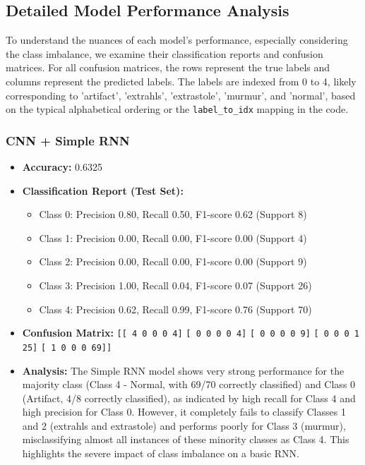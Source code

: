\documentclass[a4paper]{article}
\begin{document}
\begin{multicols}{2}
\subsection{Detailed Model Performance Analysis}
To understand the nuances of each model's performance, especially considering the class imbalance, we examine their classification reports and confusion matrices. For all confusion matrices, the rows represent the true labels and columns represent the predicted labels. The labels are indexed from 0 to 4, likely corresponding to 'artifact', 'extrahls', 'extrastole', 'murmur', and 'normal', based on the typical alphabetical ordering or the \texttt{label\_to\_idx} mapping in the code.

\subsubsection{CNN + Simple RNN}
\begin{itemize}
    \item \textbf{Accuracy:} 0.6325 
    \item \textbf{Classification Report (Test Set):} 
        \begin{itemize}
            \item Class 0: Precision 0.80, Recall 0.50, F1-score 0.62 (Support 8)
            \item Class 1: Precision 0.00, Recall 0.00, F1-score 0.00 (Support 4)
            \item Class 2: Precision 0.00, Recall 0.00, F1-score 0.00 (Support 9)
            \item Class 3: Precision 1.00, Recall 0.04, F1-score 0.07 (Support 26)
            \item Class 4: Precision 0.62, Recall 0.99, F1-score 0.76 (Support 70)
        \end{itemize}
    \item \textbf{Confusion Matrix:} 
        \texttt{[[ 4 0 0 0 4]}
        \texttt{[ 0 0 0 0 4]}
        \texttt{[ 0 0 0 0 9]}
        \texttt{[ 0 0 0 1 25]}
        \texttt{[ 1 0 0 0 69]]}
    \item \textbf{Analysis:} The Simple RNN model shows very strong performance for the majority class (Class 4 - Normal, with 69/70 correctly classified) and Class 0 (Artifact, 4/8 correctly classified), as indicated by high recall for Class 4 and high precision for Class 0. However, it completely fails to classify Classes 1 and 2 (extrahls and extrastole) and performs poorly for Class 3 (murmur), misclassifying almost all instances of these minority classes as Class 4. This highlights the severe impact of class imbalance on a basic RNN.


\end{itemize}
\end{multicols}
\end{document}
